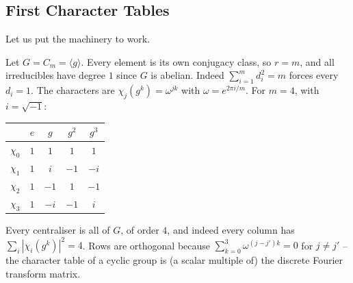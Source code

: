 \documentclass[a4paper]{scrartcl}
\newcommand{\gen}[1]{\langle #1 \rangle}
\begin{document}
\subsection{First Character Tables}

Let us put the machinery to work.

\begin{example}
	Let $G = C_m = \gen{g}$. Every element is its own conjugacy class, so $r = m$, and all irreducibles have degree $1$ since $G$ is abelian. Indeed $\sum_{i=1}^m d_i^2 = m$ forces every $d_i = 1$. The characters are $\chi_j(g^k) = \omega^{jk}$ with $\omega = e^{2\pi i/m}$. For $m = 4$, with $i = \sqrt{-1}$:
	\begin{center}
	\renewcommand{\arraystretch}{1.25}
	\setlength{\tabcolsep}{9pt}
	\begin{tabular}{c|cccc}
	\toprule
	 & $e$ & $g$ & $g^2$ & $g^3$\\
	\midrule
	$\chi_0$ & $1$ & $1$ & $1$ & $1$\\
	$\chi_1$ & $1$ & $i$ & $-1$ & $-i$\\
	$\chi_2$ & $1$ & $-1$ & $1$ & $-1$\\
	$\chi_3$ & $1$ & $-i$ & $-1$ & $i$\\
	\bottomrule
	\end{tabular}
	\end{center}
	Every centraliser is all of $G$, of order $4$, and indeed every column has $\sum_i|\chi_i(g^k)|^2 = 4$. Rows are orthogonal because $\sum_{k=0}^3 \omega^{(j - j')k} = 0$ for $j \neq j'$ -- the character table of a cyclic group is (a scalar multiple of) the discrete Fourier transform matrix.
\end{example}
\end{document}
